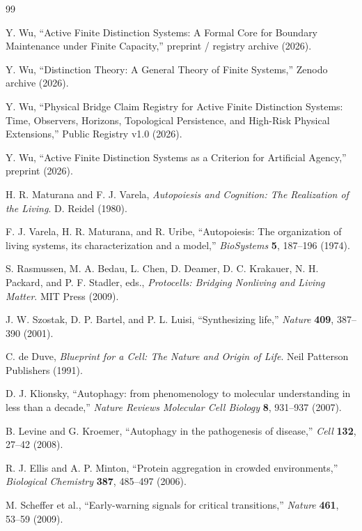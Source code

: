 \documentclass[10pt,a4paper,twocolumn,aps,prl]{revtex4-2}
\theoremstyle{claimstyle}
\theoremstyle{definition}
\begin{document}
\begin{thebibliography}{99}

Y. Wu, ``Active Finite Distinction Systems: A Formal Core for Boundary Maintenance under Finite Capacity,'' preprint / registry archive (2026).

Y. Wu, ``Distinction Theory: A General Theory of Finite Systems,'' Zenodo archive (2026).

Y. Wu, ``Physical Bridge Claim Registry for Active Finite Distinction Systems: Time, Observers, Horizons, Topological Persistence, and High-Risk Physical Extensions,'' Public Registry v1.0 (2026).

Y. Wu, ``Active Finite Distinction Systems as a Criterion for Artificial Agency,'' preprint (2026).

H. R. Maturana and F. J. Varela, \textit{Autopoiesis and Cognition: The Realization of the Living}. D. Reidel (1980).

F. J. Varela, H. R. Maturana, and R. Uribe, ``Autopoiesis: The organization of living systems, its characterization and a model,'' \textit{BioSystems} \textbf{5}, 187--196 (1974).

S. Rasmussen, M. A. Bedau, L. Chen, D. Deamer, D. C. Krakauer, N. H. Packard, and P. F. Stadler, eds., \textit{Protocells: Bridging Nonliving and Living Matter}. MIT Press (2009).

J. W. Szostak, D. P. Bartel, and P. L. Luisi, ``Synthesizing life,'' \textit{Nature} \textbf{409}, 387--390 (2001).

C. de Duve, \textit{Blueprint for a Cell: The Nature and Origin of Life}. Neil Patterson Publishers (1991).

D. J. Klionsky, ``Autophagy: from phenomenology to molecular understanding in less than a decade,'' \textit{Nature Reviews Molecular Cell Biology} \textbf{8}, 931--937 (2007).

B. Levine and G. Kroemer, ``Autophagy in the pathogenesis of disease,'' \textit{Cell} \textbf{132}, 27--42 (2008).

R. J. Ellis and A. P. Minton, ``Protein aggregation in crowded environments,'' \textit{Biological Chemistry} \textbf{387}, 485--497 (2006).

M. Scheffer et al., ``Early-warning signals for critical transitions,'' \textit{Nature} \textbf{461}, 53--59 (2009).


\end{thebibliography}
\end{document}
